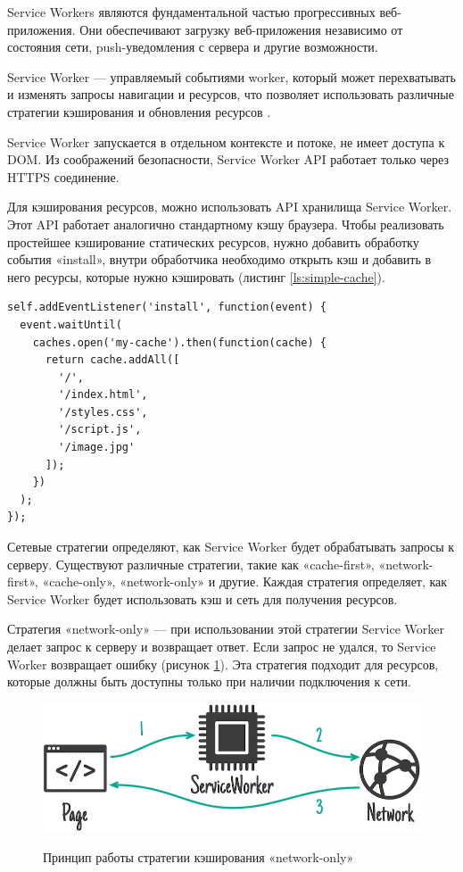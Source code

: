Service Workers являются фундаментальной частью прогрессивных веб-приложения. Они обеспечивают загрузку веб-приложения независимо от состояния сети, push-уведомления с сервера и другие возможности.

Service Worker — управляемый событиями worker, который может перехватывать и изменять запросы навигации и ресурсов, что позволяет использовать различные стратегии кэширования и обновления ресурсов \cite{serviceWorker}.

Service Worker запускается в отдельном контексте и потоке, не имеет доступа к DOM. Из соображений безопасности, Service Worker API работает только через HTTPS соединение.

Для кэширования ресурсов, можно использовать API хранилища Service Worker. Этот API работает аналогично стандартному кэшу браузера. Чтобы реализовать простейшее кэширование статических ресурсов, нужно добавить обработку события «install», внутри обработчика необходимо открыть кэш и добавить в него ресурсы, которые нужно кэшировать (листинг \ref{ls:simple-cache}).

\begin{lstlisting}[caption={Простейшее кэширование статических ресурсов}, label={ls:simple-cache}]
self.addEventListener('install', function(event) {
  event.waitUntil(
    caches.open('my-cache').then(function(cache) {
      return cache.addAll([
        '/',
        '/index.html',
        '/styles.css',
        '/script.js',
        '/image.jpg'
      ]);
    })
  );
});
\end{lstlisting}

Сетевые стратегии определяют, как Service Worker будет обрабатывать запросы к серверу. Существуют различные стратегии, такие как «cache-first», «network-first», «cache-only», «network-only» и другие. Каждая стратегия определяет, как Service Worker будет использовать кэш и сеть для получения ресурсов.

Стратегия «network-only» — при использовании этой стратегии Service Worker делает запрос к серверу и возвращает ответ. Если запрос не удался, то Service Worker возвращает ошибку (рисунок \ref{fig:network-only}). Эта стратегия подходит для ресурсов, которые должны быть доступны только при наличии подключения к сети.

\begin{figure}[H]
\begin{center}
\includegraphics[width=1.0\hsize]{fig/net-only.png}\\[2mm]
\caption{Принцип работы стратегии кэширования «network-only»}\label{fig:network-only}
\end{center}
\end{figure}

